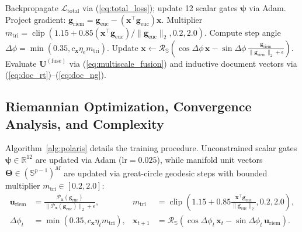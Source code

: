 \documentclass[journal]{IEEEtran}
\begin{document}
\begin{algorithm}[!t]
\begin{algorithmic}[1]
        \State Backpropagate $\mathcal{L}_{\text{total}}$ via (\ref{eq:total_loss}); update 12 scalar gates $\boldsymbol{\psi}$ via Adam.
            \State Project gradient: $\mathbf{g}_{\text{riem}} = \mathbf{g}_{\text{euc}} - (\mathbf{x}^\top\mathbf{g}_{\text{euc}})\mathbf{x}$.
            \State Multiplier $m_{\text{tri}} = \operatorname{clip}(1.15 + 0.85 (\mathbf{x}^\top\mathbf{g}_{\text{euc}})/\|\mathbf{g}_{\text{euc}}\|_2, 0.2, 2.0)$.
            \State Compute step angle $\Delta\phi = \min(0.35, c_{\mathbf{x}}\eta_e m_{\text{tri}})$.
            \State Update $\mathbf{x} \leftarrow \mathcal{R}_{\mathbb{S}}(\cos\Delta\phi\,\mathbf{x} - \sin\Delta\phi\,\frac{\mathbf{g}_{\text{riem}}}{\|\mathbf{g}_{\text{riem}}\|_2 + \epsilon})$.
        \EndFor
    \EndFor
\EndFor
\State Evaluate $\mathbf{U}^{(\text{fuse})}$ via (\ref{eq:multiscale_fusion}) and inductive document vectors via (\ref{eq:doc_rt})--(\ref{eq:doc_ng}).
\end{algorithmic}
\end{algorithm}

\subsection{Riemannian Optimization, Convergence Analysis, and Complexity}
Algorithm~\ref{alg:polaris} details the training procedure. Unconstrained scalar gates $\boldsymbol{\psi} \in \mathbb{R}^{12}$ are updated via Adam ($\text{lr}=0.025$), while manifold unit vectors $\boldsymbol{\Theta} \in (\mathbb{S}^{p-1})^M$ are updated via great-circle geodesic steps with bounded multiplier $m_{\text{tri}} \in [0.2, 2.0]$:
\begin{align}
\mathbf{u}_{\text{riem}} &= \frac{\mathcal{P}_{\mathbf{x}}(\mathbf{g}_{\text{euc}})}{\|\mathcal{P}_{\mathbf{x}}(\mathbf{g}_{\text{euc}})\|_2 + \epsilon}, & m_{\text{tri}} &= \operatorname{clip}\!\left(1.15 + 0.85\frac{\mathbf{x}^\top\mathbf{g}_{\text{euc}}}{\|\mathbf{g}_{\text{euc}}\|_2}, 0.2, 2.0\right), \label{eq:riem_dir} \\
\Delta\phi_t &= \min(0.35, c_{\mathbf{x}}\eta_t m_{\text{tri}}), & \mathbf{x}_{t+1} &= \mathcal{R}_{\mathbb{S}}\!\left(\cos\Delta\phi_t\,\mathbf{x}_t - \sin\Delta\phi_t\,\mathbf{u}_{\text{riem}}\right). \label{eq:geodesic_step}
\end{align}
\end{document}
